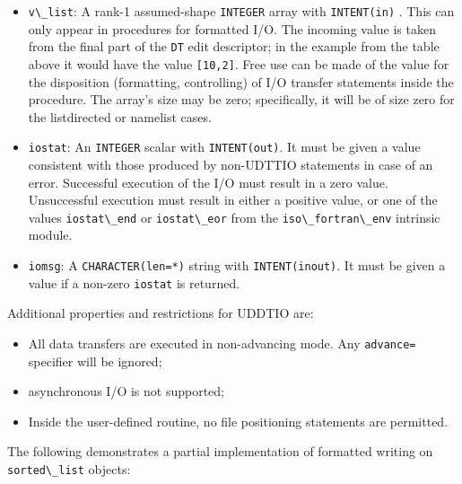 \documentclass[
  paper=a4,
  ,captions=tableheading
]{scrartcl}
\newcommand{\passthrough}[1]{#1}
\providecommand{\tightlist}{%
  \setlength{\itemsep}{0pt}\setlength{\parskip}{0pt}}
\begin{document}
\begin{itemize}
\tightlist
\item
  \passthrough{\lstinline!v\_list!}: A rank-1 assumed-shape
  \passthrough{\lstinline!INTEGER!} array with
  \passthrough{\lstinline!INTENT(in)!} . This can only appear in
  procedures for formatted I/O. The incoming value is taken from the
  final part of the \passthrough{\lstinline!DT!} edit descriptor; in the
  example from the table above it would have the value
  \passthrough{\lstinline![10,2]!}. Free use can be made of the value
  for the disposition (formatting, controlling) of I/O transfer
  statements inside the procedure. The array's size may be zero;
  specifically, it will be of size zero for the listdirected or namelist
  cases.
\item
  \passthrough{\lstinline!iostat!}: An \passthrough{\lstinline!INTEGER!}
  scalar with \passthrough{\lstinline!INTENT(out)!}. It must be given a
  value consistent with those produced by non-UDTTIO statements in case
  of an error. Successful execution of the I/O must result in a zero
  value. Unsuccessful execution must result in either a positive value,
  or one of the values \passthrough{\lstinline!iostat\_end!} or
  \passthrough{\lstinline!iostat\_eor!} from the
  \passthrough{\lstinline!iso\_fortran\_env!} intrinsic module.
\item
  \passthrough{\lstinline!iomsg!}: A
  \passthrough{\lstinline!CHARACTER(len=*)!} string with
  \passthrough{\lstinline!INTENT(inout)!}. It must be given a value if a
  non-zero \passthrough{\lstinline!iostat!} is returned.
\end{itemize}

Additional properties and restrictions for UDDTIO are:

\begin{itemize}
\tightlist
\item
  All data transfers are executed in non-advancing mode. Any
  \passthrough{\lstinline!advance=!} specifier will be ignored;
\item
  asynchronous I/O is not supported;
\item
  Inside the user-defined routine, no file positioning statements are
  permitted.
\end{itemize}

The following demonstrates a partial implementation of formatted writing
on \passthrough{\lstinline!sorted\_list!} objects:
\end{document}
